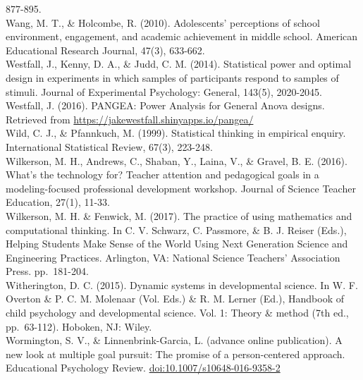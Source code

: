 \documentclass[]{book}
\theoremstyle{definition}
\theoremstyle{definition}
\theoremstyle{definition}
\theoremstyle{remark}
\begin{document}
877-895.\\
Wang, M. T., \& Holcombe, R. (2010). Adolescents' perceptions of school
environment, engagement, and academic achievement in middle school.
American Educational Research Journal, 47(3), 633-662.\\
Westfall, J., Kenny, D. A., \& Judd, C. M. (2014). Statistical power and
optimal design in experiments in which samples of participants respond
to samples of stimuli. Journal of Experimental Psychology: General,
143(5), 2020-2045.\\
Westfall, J. (2016). PANGEA: Power Analysis for General Anova designs.
Retrieved from \url{https://jakewestfall.shinyapps.io/pangea/}\\
Wild, C. J., \& Pfannkuch, M. (1999). Statistical thinking in empirical
enquiry. International Statistical Review, 67(3), 223-248.\\
Wilkerson, M. H., Andrews, C., Shaban, Y., Laina, V., \& Gravel, B. E.
(2016). What's the technology for? Teacher attention and pedagogical
goals in a modeling-focused professional development workshop. Journal
of Science Teacher Education, 27(1), 11-33.\\
Wilkerson, M. H. \& Fenwick, M. (2017). The practice of using
mathematics and computational thinking. In C. V. Schwarz, C. Passmore,
\& B. J. Reiser (Eds.), Helping Students Make Sense of the World Using
Next Generation Science and Engineering Practices. Arlington, VA:
National Science Teachers' Association Press. pp.~181-204.\\
Witherington, D. C. (2015). Dynamic systems in developmental science. In
W. F. Overton \& P. C. M. Molenaar (Vol. Eds.) \& R. M. Lerner (Ed.),
Handbook of child psychology and developmental science. Vol. 1: Theory
\& method (7th ed., pp.~63-112). Hoboken, NJ: Wiley.\\
Wormington, S. V., \& Linnenbrink-Garcia, L. (advance online
publication). A new look at multiple goal pursuit: The promise of a
person-centered approach. Educational Psychology Review.
\url{doi:10.1007/s10648-016-9358-2}


\end{document}
